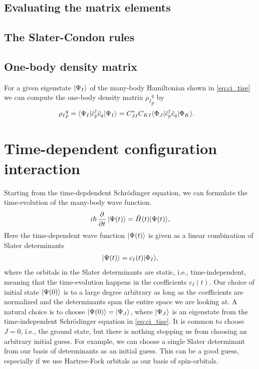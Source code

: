         \subsection{Evaluating the matrix elements}

        \subsection{The Slater-Condon rules}

        \subsection{One-body density matrix}
            For a given eigenstate $| \Psi_I \rangle$ of the many-body Hamiltonian
            shown in \autoref{eq:ci_tise} we can compute the one-body density
            matrix ${\rho_I}^{q}_{p}$ by
            \begin{align}
                {\rho_I}^{q}_{p}
                &= \langle \Psi_I |\hat{c}_{p}^{\dagger}\hat{c}_{q}| \Psi_I \rangle
                = C_{JI}^{*}C_{KI}\langle \Phi_J |\hat{c}_{p}^{\dagger}\hat{c}_{q}| \Phi_K \rangle.
            \end{align}

    \section{Time-dependent configuration interaction}
        Starting from the time-depdendent Schrödinger equation, we can formulate
        the time-evolution of the many-body wave function.
        \begin{align}
            i\hslash \dpd[]{}{t}\ket{\Psi(t)}
            = \hamil(t)\ket{\Psi(t)},
            \label{eq:ci_tdse}
        \end{align}
        Here the time-dependent wave function $| \Psi(t) \rangle$ is given as a
        linear combination of Slater determinants
        \begin{align}
            | \Psi(t) \rangle = c_{I}(t) | \Phi_I \rangle,
            \label{eq:ci_td_wave}
        \end{align}
        where the orbitals in the Slater determinants are static, i.e.,
        time-independent, meaning that the time-evolution happens in the
        coefficients $c_{I}(t)$.
        Our choice of initial state $| \Psi(0) \rangle$ is to a large degree
        arbitrary as long as the coefficients are normalized and the
        determinants span the entire space we are looking at.
        A natural choice is to choose $| \Psi(0) \rangle = | \Psi_J \rangle$, where
        $| \Psi_J \rangle$ is an eigenstate from the time-independent Schrödinger
        equation in \autoref{eq:ci_tise}.
        It is common to choose $J = 0$, i.e., the ground state, but there is
        nothing stopping us from choosing an arbitrary initial guess.
        For example, we can choose a single Slater determinant from our basis of
        determinants as an initial guess.
        This can be a good guess, especially if we use Hartree-Fock orbitals as
        our basis of spin-orbitals.

